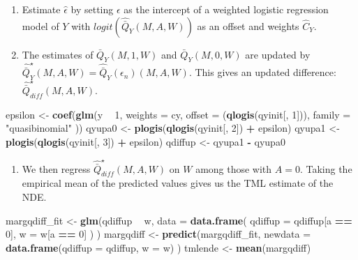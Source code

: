 \documentclass[
  12pt, krantz2,
]{book}
\makeatletter
\newenvironment{Shaded}{\begin{snugshade}}{\end{snugshade}}
\newcommand{\DataTypeTok}[1]{\textcolor[rgb]{0.13,0.29,0.53}{#1}}
\newcommand{\DecValTok}[1]{\textcolor[rgb]{0.00,0.00,0.81}{#1}}
\newcommand{\KeywordTok}[1]{\textcolor[rgb]{0.13,0.29,0.53}{\textbf{#1}}}
\newcommand{\NormalTok}[1]{#1}
\newcommand{\OperatorTok}[1]{\textcolor[rgb]{0.81,0.36,0.00}{\textbf{#1}}}
\newcommand{\StringTok}[1]{\textcolor[rgb]{0.31,0.60,0.02}{#1}}
\providecommand{\tightlist}{%
  \setlength{\itemsep}{0pt}\setlength{\parskip}{0pt}}
\newenvironment{kframe}{%
\medskip{}
\setlength{\fboxsep}{.8em}
 \def\at@end@of@kframe{}%
 \ifinner\ifhmode%
  \def\at@end@of@kframe{\end{minipage}}%
  \begin{minipage}{\columnwidth}%
 \fi\fi%
 \def\FrameCommand##1{\hskip\@totalleftmargin \hskip-\fboxsep
 \colorbox{shadecolor}{##1}\hskip-\fboxsep
     \hskip-\linewidth \hskip-\@totalleftmargin \hskip\columnwidth}%
 \MakeFramed {\advance\hsize-\width
   \@totalleftmargin\z@ \linewidth\hsize
   \@setminipage}}%
 {\par\unskip\endMakeFramed%
 \at@end@of@kframe}
\renewenvironment{Shaded}{\begin{kframe}}{\end{kframe}}
\theoremstyle{definition}
\theoremstyle{definition}
\theoremstyle{definition}
\newcommand{\1}{\mathbbm{1}}
\makeatother
\begin{document}
\begin{enumerate}
\def\labelenumi{\arabic{enumi}.}
\setcounter{enumi}{3}
\item
  Estimate \(\hat{\epsilon}\) by setting \(\epsilon\) as the intercept of a
  weighted logistic regression model of \(Y\) with
  \(logit(\hat{\bar{Q}}_{Y}(M,A,W))\) as an offset and weights \(\hat{C}_{Y}\).
\item
  The estimates of \(\bar{Q}_{Y}(M,1,W)\) and \(\bar{Q}_{Y}(M,0,W)\) are updated
  by \(\hat{\bar{Q}}^{\star}_{Y}(M,A,W) = \hat{\bar{Q}}_{Y}(\epsilon_n)(M,A,W)\). This gives an updated difference:
  \(\hat{\bar{Q}}^{\star}_{diff}(M,A,W)\).
\end{enumerate}

\begin{Shaded}
\begin{Highlighting}[]
\NormalTok{epsilon <-}\StringTok{ }\KeywordTok{coef}\NormalTok{(}\KeywordTok{glm}\NormalTok{(y }\OperatorTok{~}\StringTok{ }\DecValTok{1}\NormalTok{,}
  \DataTypeTok{weights =}\NormalTok{ cy, }\DataTypeTok{offset =}\NormalTok{ (}\KeywordTok{qlogis}\NormalTok{(qyinit[, }\DecValTok{1}\NormalTok{])),}
  \DataTypeTok{family =} \StringTok{"quasibinomial"}
\NormalTok{))}
\NormalTok{qyupa0 <-}\StringTok{ }\KeywordTok{plogis}\NormalTok{(}\KeywordTok{qlogis}\NormalTok{(qyinit[, }\DecValTok{2}\NormalTok{]) }\OperatorTok{+}\StringTok{ }\NormalTok{epsilon)}
\NormalTok{qyupa1 <-}\StringTok{ }\KeywordTok{plogis}\NormalTok{(}\KeywordTok{qlogis}\NormalTok{(qyinit[, }\DecValTok{3}\NormalTok{]) }\OperatorTok{+}\StringTok{ }\NormalTok{epsilon)}
\NormalTok{qdiffup <-}\StringTok{ }\NormalTok{qyupa1 }\OperatorTok{-}\StringTok{ }\NormalTok{qyupa0}
\end{Highlighting}
\end{Shaded}

\begin{enumerate}
\def\labelenumi{\arabic{enumi}.}
\setcounter{enumi}{5}
\tightlist
\item
  We then regress \(\hat{\bar{Q}}^{\star}_{diff}(M,A,W)\) on \(W\) among those
  with \(A=0\). Taking the empirical mean of the predicted values gives us the
  TML estimate of the NDE.
\end{enumerate}

\begin{Shaded}
\begin{Highlighting}[]
\NormalTok{margqdiff_fit <-}\StringTok{ }\KeywordTok{glm}\NormalTok{(qdiffup }\OperatorTok{~}\StringTok{ }\NormalTok{w,}
  \DataTypeTok{data =} \KeywordTok{data.frame}\NormalTok{(}
    \DataTypeTok{qdiffup =}\NormalTok{ qdiffup[a }\OperatorTok{==}\StringTok{ }\DecValTok{0}\NormalTok{],}
    \DataTypeTok{w =}\NormalTok{ w[a }\OperatorTok{==}\StringTok{ }\DecValTok{0}\NormalTok{]}
\NormalTok{  )}
\NormalTok{)}
\NormalTok{margqdiff <-}\StringTok{ }\KeywordTok{predict}\NormalTok{(margqdiff_fit,}
  \DataTypeTok{newdata =} \KeywordTok{data.frame}\NormalTok{(}\DataTypeTok{qdiffup =}\NormalTok{ qdiffup, }\DataTypeTok{w =}\NormalTok{ w)}
\NormalTok{)}
\NormalTok{tmlende <-}\StringTok{ }\KeywordTok{mean}\NormalTok{(margqdiff)}
\end{Highlighting}
\end{Shaded}
\end{document}
